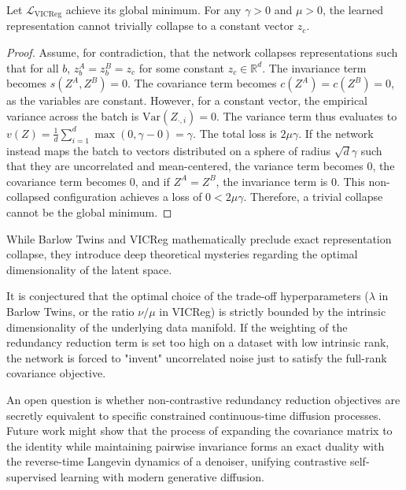 \begin{lemma}
Let $\mathcal{L}_{\text{VICReg}}$ achieve its global minimum. For any $\gamma > 0$ and $\mu > 0$, the learned representation cannot trivially collapse to a constant vector $z_c$.
\end{lemma}
\begin{proof}
Assume, for contradiction, that the network collapses representations such that for all $b$, $z^A_b = z^B_b = z_c$ for some constant $z_c \in \mathbb{R}^d$. 
The invariance term becomes $s(Z^A, Z^B) = 0$. 
The covariance term becomes $c(Z^A) = c(Z^B) = 0$, as the variables are constant. 
However, for a constant vector, the empirical variance across the batch is $\text{Var}(Z_{\cdot, i}) = 0$.
The variance term thus evaluates to $v(Z) = \frac{1}{d} \sum_{i=1}^d \max(0, \gamma - 0) = \gamma$.
The total loss is $2\mu\gamma$.
If the network instead maps the batch to vectors distributed on a sphere of radius $\sqrt{d}\gamma$ such that they are uncorrelated and mean-centered, the variance term becomes $0$, the covariance term becomes $0$, and if $Z^A = Z^B$, the invariance term is $0$. This non-collapsed configuration achieves a loss of $0 < 2\mu\gamma$. Therefore, a trivial collapse cannot be the global minimum.
\end{proof}

\begin{horizon}
While Barlow Twins and VICReg mathematically preclude exact representation collapse, they introduce deep theoretical mysteries regarding the optimal dimensionality of the latent space. 

It is conjectured that the optimal choice of the trade-off hyperparameters ($\lambda$ in Barlow Twins, or the ratio $\nu/\mu$ in VICReg) is strictly bounded by the intrinsic dimensionality of the underlying data manifold. If the weighting of the redundancy reduction term is set too high on a dataset with low intrinsic rank, the network is forced to "invent" uncorrelated noise just to satisfy the full-rank covariance objective. 

An open question is whether non-contrastive redundancy reduction objectives are secretly equivalent to specific constrained continuous-time diffusion processes. Future work might show that the process of expanding the covariance matrix to the identity while maintaining pairwise invariance forms an exact duality with the reverse-time Langevin dynamics of a denoiser, unifying contrastive self-supervised learning with modern generative diffusion.
\end{horizon}

